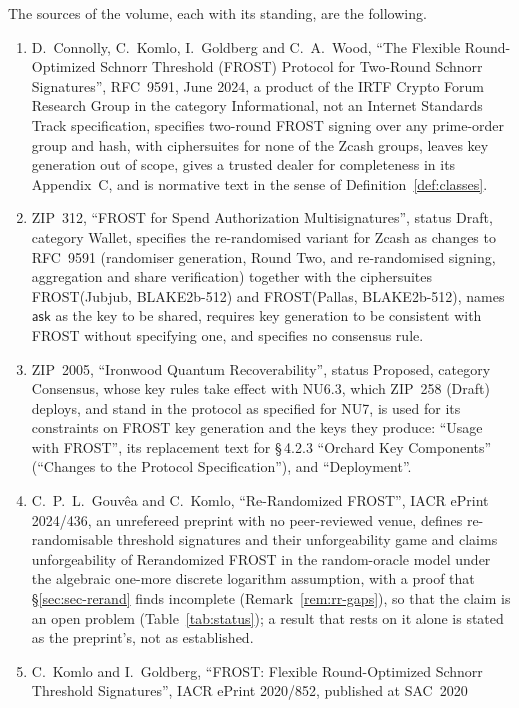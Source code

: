 \documentclass[11pt,a4paper]{article}
\theoremstyle{definition}
\newcommand{\ask}{\ensuremath{\mathsf{ask}}}
\begin{document}
The sources of the volume, each with its standing, are the following.
\begin{enumerate}[label=(\alph*)]
\item D.~Connolly, C.~Komlo, I.~Goldberg and C.~A.~Wood, ``The Flexible
  Round-Optimized Schnorr Threshold (FROST) Protocol for Two-Round Schnorr
  Signatures'', RFC~9591, June 2024, a product of the IRTF Crypto Forum
  Research Group in the category Informational, not an Internet Standards
  Track specification, specifies two-round FROST signing over any
  prime-order group and hash, with ciphersuites for none of the Zcash
  groups, leaves key generation out of scope, gives a trusted dealer for
  completeness in its Appendix~C, and is normative text in the sense of
  Definition~\ref{def:classes}.
\item ZIP~312, ``FROST for Spend Authorization Multisignatures'', status
  Draft, category Wallet, specifies the re-randomised variant for Zcash as
  changes to RFC~9591 (randomiser generation, Round Two, and re-randomised
  signing, aggregation and share verification) together with the
  ciphersuites FROST(Jubjub, BLAKE2b-512) and FROST(Pallas, BLAKE2b-512),
  names \(\ask\) as the key to be shared, requires key generation to be
  consistent with FROST without specifying one, and specifies no consensus
  rule.
\item ZIP~2005, ``Ironwood Quantum Recoverability'', status Proposed,
  category Consensus, whose key rules take effect with NU6.3, which ZIP~258
  (Draft) deploys, and stand in the protocol as specified for NU7, is used
  for its constraints on FROST key generation and the keys they produce:
  ``Usage with FROST'', its replacement text for \S\,4.2.3 ``Orchard Key
  Components'' (``Changes to the Protocol Specification''), and
  ``Deployment''.
\item C.~P.~L.~Gouv\^{e}a and C.~Komlo, ``Re-Randomized FROST'', IACR ePrint
  2024/436, an unrefereed preprint with no peer-reviewed venue, defines
  re-randomisable threshold signatures and their unforgeability game and
  claims unforgeability of Rerandomized FROST in the random-oracle model
  under the algebraic one-more discrete logarithm assumption, with a proof
  that \S\ref{sec:sec-rerand} finds incomplete (Remark~\ref{rem:rr-gaps}),
  so that the claim is an open problem (Table~\ref{tab:status}); a result that
  rests on it alone is stated as the preprint's, not as established.
\item C.~Komlo and I.~Goldberg, ``FROST: Flexible Round-Optimized Schnorr
  Threshold Signatures'', IACR ePrint 2020/852, published at SAC~2020

\end{enumerate}
\end{document}
